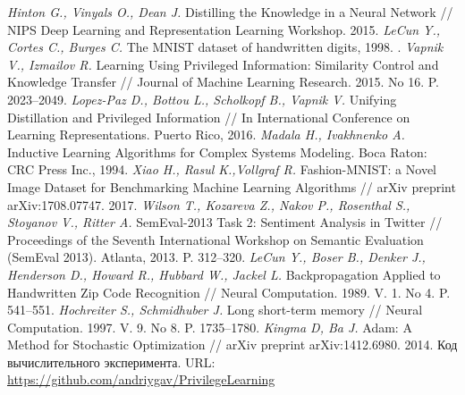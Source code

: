 \documentclass[12pt]{a&t}
\begin{document}
\begin{thebibliography}{10}
        \textit{Hinton G., Vinyals O., Dean J.} Distilling the Knowledge in a Neural Network // NIPS Deep Learning and Representation Learning Workshop. 2015.
	\textit{LeCun Y.,  Cortes C., Burges C.} The MNIST dataset of handwritten digits, 1998. .
	\textit{Vapnik V., Izmailov R.} Learning Using Privileged Information: Similarity Control and Knowledge Transfer // Journal of Machine Learning Research. 2015. No 16. P. 2023--2049.
	\textit{Lopez-Paz D., Bottou L., Scholkopf B., Vapnik V.} Unifying Distillation and Privileged Information // In International Conference on Learning Representations. Puerto Rico, 2016.
	\textit{Madala H., Ivakhnenko A.} Inductive Learning Algorithms for Complex Systems Modeling. Boca Raton: CRC Press Inc., 1994.
	\textit{Xiao H., Rasul K.,Vollgraf R.} Fashion-MNIST: a Novel Image Dataset for Benchmarking Machine Learning Algorithms // arXiv preprint arXiv:1708.07747. 2017.
	\textit{Wilson T., Kozareva Z., Nakov P., Rosenthal S., Stoyanov V., Ritter A.} {S}em{E}val-2013 Task 2: Sentiment Analysis in Twitter // Proceedings of the Seventh International Workshop on Semantic Evaluation ({S}em{E}val 2013). Atlanta, 2013. P. 312--320.
	\textit{LeCun Y., Boser B., Denker J., Henderson D., Howard R., Hubbard W., Jackel L.} Backpropagation Applied to Handwritten Zip Code Recognition // Neural Computation. 1989. V. 1. No 4. P. 541--551.
	\textit{Hochreiter S., Schmidhuber J.} Long short-term memory // Neural Computation. 1997. V. 9. No 8.  P. 1735--1780.
	\textit{Kingma D, Ba J.} Adam: A Method for Stochastic Optimization // arXiv preprint arXiv:1412.6980. 2014.
	Код вычислительного эксперимента. URL: \url{https://github.com/andriygav/PrivilegeLearning}
 \end{thebibliography}



\end{document}
